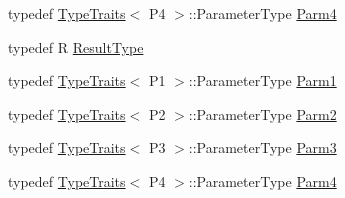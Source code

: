 \begin{DoxyCompactItemize}
\item 
typedef \mbox{\hyperlink{classUtil_1_1TypeTraits}{Type\+Traits}}$<$ P4 $>$\+::Parameter\+Type \mbox{\hyperlink{classUtil_1_1FunctorImpl_3_01R_00_01TYPELIST__4_07P1_00_01P2_00_01P3_00_01P4_08_4_a7375a2710126cb146191bd1c17af2f1d}{Parm4}}
\item 
typedef R \mbox{\hyperlink{classUtil_1_1FunctorImpl_3_01R_00_01TYPELIST__4_07P1_00_01P2_00_01P3_00_01P4_08_4_a9218a4b4370d688d3e144a75e5d24cfe}{Result\+Type}}
\item 
typedef \mbox{\hyperlink{classUtil_1_1TypeTraits}{Type\+Traits}}$<$ P1 $>$\+::Parameter\+Type \mbox{\hyperlink{classUtil_1_1FunctorImpl_3_01R_00_01TYPELIST__4_07P1_00_01P2_00_01P3_00_01P4_08_4_ab22bf7d6b59a883bb4a582f3a8ceaccc}{Parm1}}
\item 
typedef \mbox{\hyperlink{classUtil_1_1TypeTraits}{Type\+Traits}}$<$ P2 $>$\+::Parameter\+Type \mbox{\hyperlink{classUtil_1_1FunctorImpl_3_01R_00_01TYPELIST__4_07P1_00_01P2_00_01P3_00_01P4_08_4_aaf289567dfbd9f3379db79d06f02f4a7}{Parm2}}
\item 
typedef \mbox{\hyperlink{classUtil_1_1TypeTraits}{Type\+Traits}}$<$ P3 $>$\+::Parameter\+Type \mbox{\hyperlink{classUtil_1_1FunctorImpl_3_01R_00_01TYPELIST__4_07P1_00_01P2_00_01P3_00_01P4_08_4_a50b605c92c54da7770a000867a97287a}{Parm3}}
\item 
typedef \mbox{\hyperlink{classUtil_1_1TypeTraits}{Type\+Traits}}$<$ P4 $>$\+::Parameter\+Type \mbox{\hyperlink{classUtil_1_1FunctorImpl_3_01R_00_01TYPELIST__4_07P1_00_01P2_00_01P3_00_01P4_08_4_a7375a2710126cb146191bd1c17af2f1d}{Parm4}}
\end{DoxyCompactItemize}
